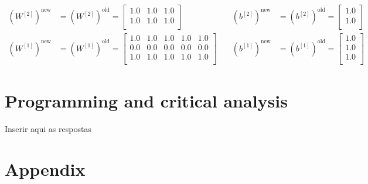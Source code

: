 \documentclass{exam}
\begin{document}
\begin{questions}
\begin{itemize}
                \begin{equation*}
                    \begin{split}
                        (W^{[2]})^{\text{new}} &= (W^{[2]})^{\text{old}} = 
                        \begin{bmatrix}
                            1.0 & 1.0 & 1.0  \\
                            1.0 & 1.0 & 1.0  \\
                        \end{bmatrix}  \\
                        (W^{[1]})^{\text{new}} &= (W^{[1]})^{\text{old}} = 
                        \begin{bmatrix}
                            1.0 & 1.0 & 1.0 & 1.0 & 1.0  \\
                            0.0 & 0.0 & 0.0 & 0.0 & 0.0  \\
                            1.0 & 1.0 & 1.0 & 1.0 & 1.0  \\
                        \end{bmatrix}
                    \end{split} \quad
                    \begin{split}
                        (b^{[2]})^{\text{new}} &= (b^{[2]})^{\text{old}} = 
                        \begin{bmatrix}
                            1.0  \\
                            1.0  \\
                        \end{bmatrix} \\
                        (b^{[1]})^{\text{new}} &= (b^{[1]})^{\text{old}} = 
                        \begin{bmatrix}
                            1.0  \\
                            1.0  \\
                            1.0  \\
                        \end{bmatrix}
                    \end{split}
                \end{equation*}
            \end{itemize}
    \end{questions}






    \section{Programming and critical analysis}
    \begin{questions}
        \setcounter{question}{3}
        \item Inserir aqui as respostas
    \end{questions}

    \pagebreak
    \section{Appendix}
    \inputminted{python}{src/ex02.py}
   
    
    
\end{document}
